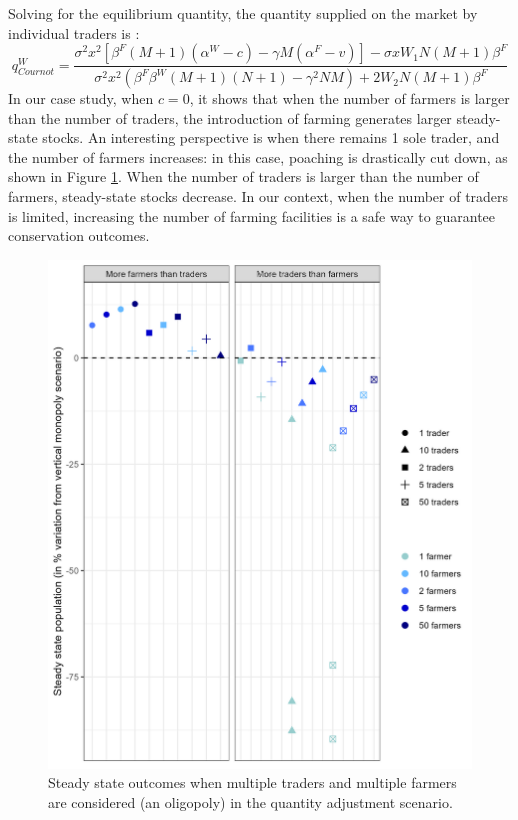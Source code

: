 %
Solving for the equilibrium quantity, the quantity supplied on the market by individual traders is : 
%
\begin{equation}
    q^W_{Cournot} = \frac{\sigma^2 x^2 \left[ \beta^F(M+1) (\alpha^W - c) - \gamma M(\alpha^F -v) \right] - \sigma x W_1 N(M+1) \beta^F}{\sigma^2 x^2 (\beta^F \beta^W (M+1)(N+1)-\gamma^2 NM) + 2W_2N(M+1)\beta^F}
\end{equation}
In our case study, when $c=0$, it 
shows that when the number of farmers is larger than the number of traders, the introduction of farming generates larger steady-state stocks. An interesting perspective is when there remains 1 sole trader, and the number of farmers increases: in this case, poaching is drastically cut down, as shown in Figure \ref{fig:cournot_oligo}.
%
When the number of traders is larger than the number of farmers, steady-state stocks decrease. In our context, when the number of traders is limited, increasing the number of farming facilities is a safe way to guarantee conservation outcomes. 

\begin{figure}[H]
    \centering
    \includegraphics[width=.7\textwidth]{figures/totoaba/sup_figure1.jpg}
    \caption{Steady state outcomes when multiple traders and multiple farmers are  considered (an oligopoly) in the quantity adjustment scenario.}
    \label{fig:cournot_oligo}
\end{figure}
%

